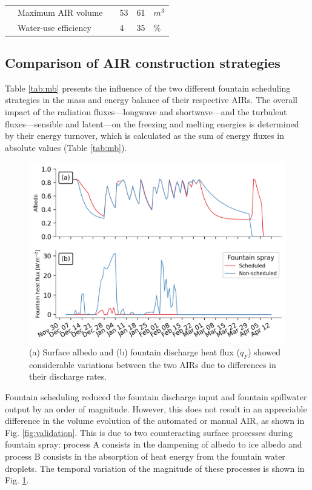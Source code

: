 \documentclass[tc, manuscript]{copernicus}
\begin{document}
\begin{table}
\begin{tabular}{@{}|llllll|@{}}
		                       & Maximum AIR volume              &                 & 53            & 61            & $m^{3}$ \\
		\multicolumn{1}{|l|}{} & Water-use efficiency            &                 & 4             & 35            & \% \\\midrule
	\end{tabular}
\end{table}

\subsection{Comparison of AIR construction strategies}

Table \ref{tab:mb} presents the influence of the two different fountain scheduling strategies in the mass and
energy balance of their respective AIRs.  The overall impact of the radiation fluxes---longwave and
shortwave---and the turbulent fluxes---sensible and latent---on the freezing and melting energies is determined
by their energy turnover, which is calculated as the sum of energy fluxes in absolute values (Table
\ref{tab:mb}). 

\begin{figure}[htb]
\includegraphics[width=12cm]{Figures/dis_processes.png}

\caption{(a) Surface albedo  and (b) fountain discharge heat flux ($q_F$) showed considerable variations between the two
  AIRs due to differences in their discharge rates.}

\label{fig:dis_processes}
\end{figure}

Fountain scheduling reduced the fountain discharge input and fountain spillwater output by an order of
magnitude. However, this does not result in an appreciable difference in the volume evolution of the automated
or manual AIR, as shown in Fig. \ref{fig:validation}. This is due to two counteracting surface processes during
fountain spray: process A consists in the dampening of albedo to ice albedo and process B consists in the
absorption of heat energy from the fountain water droplets. The temporal variation of the magnitude of these
processes is shown in Fig. \ref{fig:dis_processes}.
\end{document}

